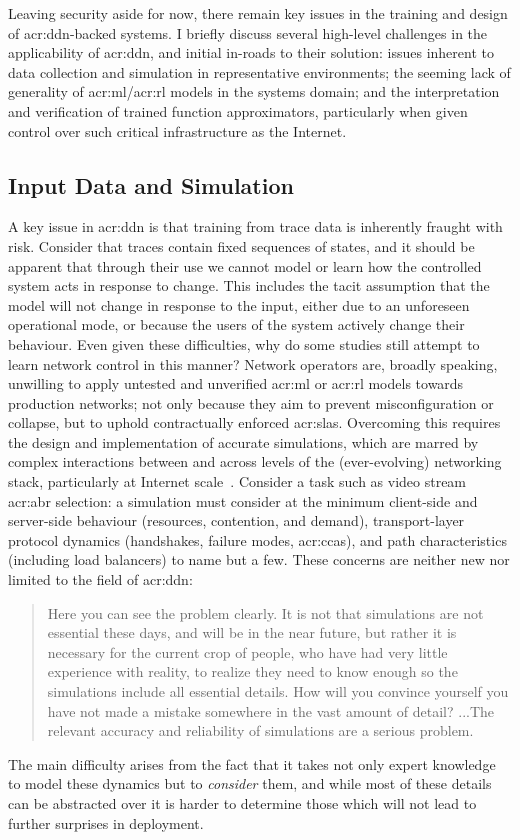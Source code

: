 Leaving security aside for now, there remain key issues in the training and design of \gls{acr:ddn}-backed systems.
I briefly discuss several high-level challenges in the applicability of \gls{acr:ddn}, and initial in-roads to their solution: issues inherent to data collection and simulation in representative environments; the seeming lack of generality of \gls{acr:ml}/\gls{acr:rl} models in the systems domain; and the interpretation and verification of trained function approximators, particularly when given control over such critical infrastructure as the Internet.

\subsection{Input Data and Simulation}
A key issue in \gls{acr:ddn} is that training from trace data is inherently fraught with risk.
Consider that traces contain fixed sequences of states, and it should be apparent that through their use we cannot model or learn how the controlled system acts in response to change.
This includes the tacit assumption that the model will not change in response to the input, either due to an unforeseen operational mode, or because the users of the system actively change their behaviour.
Even given these difficulties, why do some studies still attempt to learn network control in this manner?
Network operators are, broadly speaking, unwilling to apply untested and unverified \gls{acr:ml} or \gls{acr:rl} models towards production networks; not only because they aim to prevent misconfiguration or collapse, but to uphold contractually enforced \glspl{acr:sla}.
Overcoming this requires the design and implementation of accurate simulations, which are marred by complex interactions between and across levels of the (ever-evolving) networking stack, particularly at Internet scale~\parencite{DBLP:journals/ton/X01c}.
Consider a task such as video stream \gls{acr:abr} selection: a simulation must consider at the minimum client-side and server-side behaviour (resources, contention, and demand), transport-layer protocol dynamics (handshakes, failure modes, \glspl{acr:cca}), and path characteristics (including load balancers) to name but a few.
These concerns are neither new nor limited to the field of \gls{acr:ddn}:
\begin{quotation}
\noindent
Here you can see the problem clearly.
It is not that simulations are not essential these days, and will be in the near future, but rather it is necessary for the current crop of people, who have had very little experience with reality, to realize they need to know enough so the simulations include all essential details.
How will you convince yourself you have not made a mistake somewhere in the vast amount of detail?
...The relevant accuracy and reliability of simulations are a serious problem.\\
\strut\hfill\parencite[pp. 248]{hamming-art-of-scieng} 
\end{quotation}
The main difficulty arises from the fact that it takes not only expert knowledge to model these dynamics but to \emph{consider} them, and while most of these details can be abstracted over it is harder to determine those which will not lead to further surprises in deployment.

